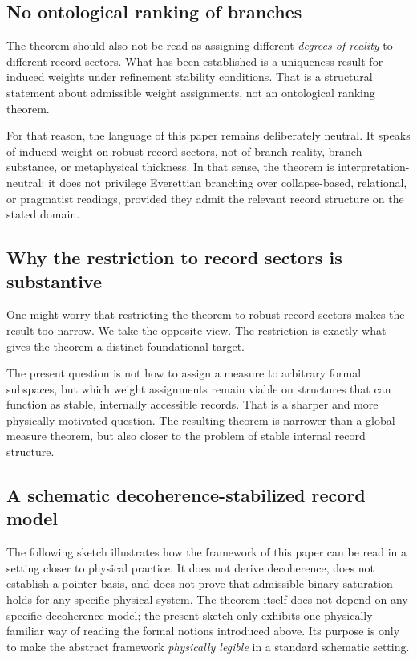 \documentclass[11pt]{article}
\theoremstyle{remark}
\numberwithin{equation}{section}
\begin{document}
\subsection{No ontological ranking of branches}

The theorem should also not be read as assigning different \emph{degrees of reality} to different record sectors. What has been established is a uniqueness result for induced weights under refinement stability conditions. That is a structural statement about admissible weight assignments, not an ontological ranking theorem.

For that reason, the language of this paper remains deliberately neutral. It speaks of induced weight on robust record sectors, not of branch reality, branch substance, or metaphysical thickness. In that sense, the theorem is interpretation-neutral: it does not privilege Everettian branching over collapse-based, relational, or pragmatist readings, provided they admit the relevant record structure on the stated domain.

\subsection{Why the restriction to record sectors is substantive}

One might worry that restricting the theorem to robust record sectors makes the result too narrow. We take the opposite view. The restriction is exactly what gives the theorem a distinct foundational target.

The present question is not how to assign a measure to arbitrary formal subspaces, but which weight assignments remain viable on structures that can function as stable, internally accessible records. That is a sharper and more physically motivated question. The resulting theorem is narrower than a global measure theorem, but also closer to the problem of stable internal record structure.

\subsection{A schematic decoherence-stabilized record model}
\label{subsec:decoherence-schematic}

The following sketch illustrates how the framework of this paper can
be read in a setting closer to physical practice. It does not derive
decoherence, does not establish a pointer basis, and does not prove
that admissible binary saturation holds for any specific physical
system. The theorem itself does not depend on any specific
decoherence model; the present sketch only exhibits one physically
familiar way of reading the formal notions introduced above. Its
purpose is only to make the abstract framework \emph{physically
legible} in a standard schematic setting.
\end{document}
